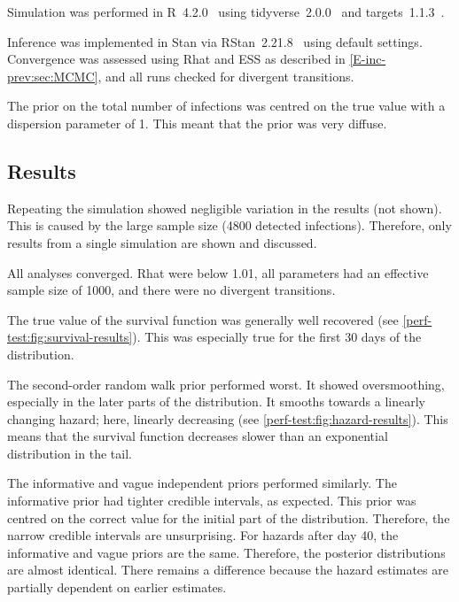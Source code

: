 \documentclass[thesis.tex]{subfiles}
\begin{document}
Simulation was performed in R~4.2.0~\autocite{R-4-2-0} using tidyverse~2.0.0~\autocite{tidyverse} and targets~1.1.3~\autocite{targetsPackage}.

Inference was implemented in Stan via RStan~2.21.8~\autocite{rstan2-21-8} using default settings.
Convergence was assessed using Rhat and ESS as described in \cref{E-inc-prev:sec:MCMC}, and all runs checked for divergent transitions.

The prior on the total number of infections was centred on the true value with a dispersion parameter of 1.
This meant that the prior was very diffuse.


\subsection{Results} \label{perf-test:sec:results}

Repeating the simulation showed negligible variation in the results (not shown).
This is caused by the large sample size (4800 detected infections).
Therefore, only results from a single simulation are shown and discussed.

All analyses converged.
Rhat were below 1.01, all parameters had an effective sample size of 1000, and there were no divergent transitions.

The true value of the survival function was generally well recovered (see \cref{perf-test:fig:survival-results}).
This was especially true for the first 30 days of the distribution.

The second-order random walk prior performed worst.
It showed oversmoothing, especially in the later parts of the distribution.
It smooths towards a linearly changing hazard; here, linearly decreasing (see \cref{perf-test:fig:hazard-results}).
This means that the survival function decreases slower than an exponential distribution in the tail.

The informative and vague independent priors performed similarly.
The informative prior had tighter credible intervals, as expected.
This prior was centred on the correct value for the initial part of the distribution.
Therefore, the narrow credible intervals are unsurprising.
For hazards after day 40, the informative and vague priors are the same.
Therefore, the posterior distributions are almost identical.
There remains a difference because the hazard estimates are partially dependent on earlier estimates.
\end{document}
